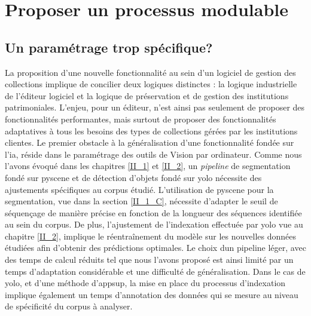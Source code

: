 \section{\label{III_3_A} Proposer un processus modulable}


\subsection{Un paramétrage trop spécifique?}
La proposition d'une nouvelle fonctionnalité au sein d'un logiciel de gestion des collections implique de concilier deux logiques distinctes : la logique industrielle de l'éditeur logiciel et la logique de préservation et de gestion des institutions patrimoniales. L'enjeu, pour un éditeur, n'est ainsi pas seulement de proposer des fonctionnalités performantes, mais surtout de proposer des fonctionnalités adaptatives à tous les besoins des types de collections gérées par les institutions clientes. 
Le premier obstacle à la généralisation d'une fonctionnalité fondée sur l'\gls{ia}, réside dans le paramétrage des outils de \gls{Vision par ordinateur}. Comme nous l'avons évoqué dans les chapitres \ref{II_1} et \ref{II_2}, un \textit{pipeline} de segmentation fondé sur \gls{pyscene} et de détection d'objets fondé sur \gls{yolo} nécessite des ajustements spécifiques au corpus étudié. L'utilisation de \gls{pyscene} pour la segmentation, vue dans la section \ref{II_1_C}, nécessite d'adapter le seuil de séquençage de manière précise en fonction de la longueur des séquences identifiée au sein du corpus. De plus, l'ajustement de l'indexation effectuée par \gls{yolo} vue au chapitre \ref{II_2}, implique le réentraînement du modèle sur les nouvelles données étudiées afin d'obtenir des prédictions optimales. Le choix dun pipeline léger, avec des temps de calcul réduits tel que nous l'avons proposé est ainsi limité par un temps d'adaptation considérable et une difficulté de généralisation. Dans le cas de \gls{yolo}, et d'une méthode d'\gls{appsup}, la mise en place du processus d'indexation implique également un temps d'annotation des données qui se mesure au niveau de spécificité du corpus à analyser. 

